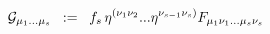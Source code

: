 \begin{equation}
{\cal{G}}_{\mu_1 ... \mu_s} \;\; := \;\; f_s \, \eta^{( \nu_1 \nu_2} ... \eta^{\nu_{s-1} \nu_s )} F_{\mu_1 \nu_1 ... \mu_s \nu_s}
\label{eq:x13}
\end{equation}

